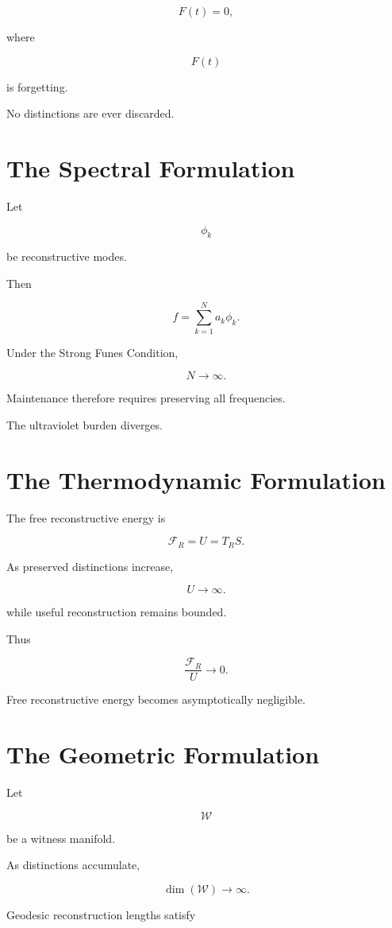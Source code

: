 \documentclass[12pt,oneside]{book}
\theoremstyle{plain} \newtheorem{theorem}{Theorem}[chapter] \newtheorem{lemma}[theorem]{Lemma} \newtheorem{proposition}[theorem]{Proposition} \newtheorem{corollary}[theorem]{Corollary}
\theoremstyle{definition} \newtheorem{definition}[theorem]{Definition} \newtheorem{axiom}[theorem]{Axiom} \newtheorem{construction}[theorem]{Construction}
\theoremstyle{remark} \newtheorem{remark}[theorem]{Remark} \newtheorem{example}[theorem]{Example}
\begin{document}
\[
F(t)
=
0,
\]

where

\[
F(t)
\]

is forgetting.

No distinctions are ever discarded.

\section{The Spectral Formulation}

Let

\[
{\phi_k}
\]

be reconstructive modes.

Then

\[
f
=
\sum_{k=1}^{N}
a_k\phi_k.
\]

Under the Strong Funes Condition,

\[
N
\rightarrow
\infty.
\]

Maintenance therefore requires preserving all frequencies.

The ultraviolet burden diverges.

\section{The Thermodynamic Formulation}

The free reconstructive energy is

\[
\mathcal F_R
=
U
=
T_RS.
\]

As preserved distinctions increase,

\[
U
\rightarrow
\infty.
\]

while useful reconstruction remains bounded.

Thus

\[
\frac{\mathcal F_R}{U}
\rightarrow
0.
\]

Free reconstructive energy becomes asymptotically negligible.

\section{The Geometric Formulation}

Let

\[
\mathcal W
\]

be a witness manifold.

As distinctions accumulate,

\[
\dim(\mathcal W)
\rightarrow
\infty.
\]

Geodesic reconstruction lengths satisfy
\end{document}
